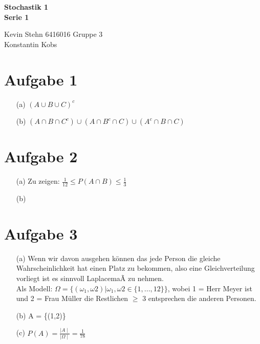 \documentclass[10pt,a4paper]{article}
\begin{document}
\begin{center}
\textbf{Stochastik 1 \\ Serie 1 \\}
\end{center}

\begin{flushright}
Kevin Stehn 6416016 Gruppe 3 \\
Konstantin Kobs
\end{flushright}

\section*{Aufgabe 1}
\begin{itemize}
\item[(a)] $(A \cup B \cup C)^{c}$
\item[(b)] 
$(A \cap B \cap C^{c}) \cup (A \cap B^{c} \cap C) \cup (A^{c} \cap B \cap C)$
\end{itemize}

\section*{Aufgabe 2}
\begin{itemize}
\item[(a)]
Zu zeigen: $\frac{1}{12} \leq P(A \cap B) \leq \frac{1}{3}$

\item[(b)]
\end{itemize}

\section*{Aufgabe 3}
\begin{itemize}
\item[(a)] Wenn wir davon ausgehen können das jede Person die gleiche Wahrscheinlichkeit hat einen Platz zu bekommen, also eine Gleichverteilung vorliegt ist es sinnvoll LaplacemaÃ zu nehmen.\\
Als Modell: $ \Omega = \{(\omega_{1},\omega{2}) | \omega_{1},\omega{2} \in\{1,...,12\} \} $, wobei 1 = Herr Meyer ist und 2 = Frau Müller die Restlichen $\geq$ 3 entsprechen die anderen Personen. 

\item[(b)]
A = \{(1,2)\}

\item[(c)]
$P(A) = \frac{\mid A \mid}{\mid \Omega \mid} = \frac{1}{78}$ %
\end{itemize}
\end{document}

